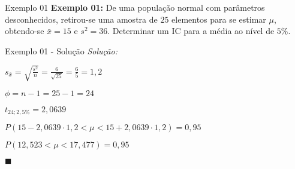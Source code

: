 \documentclass[hyperref={pdfpagelabels=false}]{beamer}
\begin{document}
\begin{frame}{Exemplo 01}
	\textbf{Exemplo 01:} De uma população normal com parâmetros desconhecidos, retirou-se uma amostra de $25$ elementos para se estimar $\mu$, obtendo-se $\bar{x} = 15$ e $s^2 = 36$. Determinar um IC para a média ao nível de $5\%$.
	
\end{frame}

\begin{frame}{Exemplo 01 - Solução}
\textit{Solução:}

$s_{\bar{x}}=\displaystyle \sqrt{\frac{s^2}{n}} = \frac{6}{\sqrt{25}} = \frac{6}{5} = 1,2$ \pause

$\phi = n - 1 = 25 - 1 = 24$ \pause

$t_{24;2,5\%} = 2,0639$ \pause

$P(15 - 2,0639 \cdot 1,2 < \mu < 15 + 2,0639 \cdot 1,2) = 0,95$ \pause

$P(12,523 < \mu < 17,477) = 0,95$ \pause

\begin{flushright}
	$\blacksquare$
\end{flushright}
\end{frame}
\end{document}
